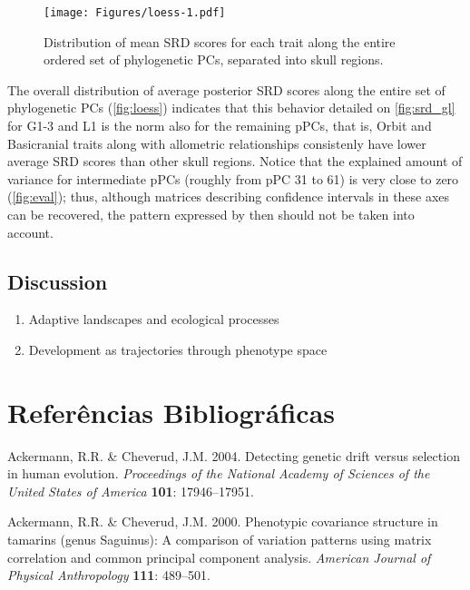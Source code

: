 \documentclass[12pt,twoside]{report}
\begin{document}
\begin{figure}[htbp]
\centering
\texttt{[image: Figures/loess-1.pdf]}
\caption{Distribution of mean SRD scores for each trait along the entire
ordered set of phylogenetic PCs, separated into skull regions.
\label{fig:loess}}
\end{figure}

The overall distribution of average posterior SRD scores along the
entire set of phylogenetic PCs (\autoref{fig:loess}) indicates that this
behavior detailed on \autoref{fig:srd_gl} for G1-3 and L1 is the norm
also for the remaining pPCs, that is, Orbit and Basicranial traits along
with allometric relationships consistenly have lower average SRD scores
than other skull regions. Notice that the explained amount of variance
for intermediate pPCs (roughly from pPC 31 to 61) is very close to zero
(\autoref{fig:eval}); thus, although matrices describing confidence
intervals in these axes can be recovered, the pattern expressed by then
should not be taken into account.

\section{Discussion}\label{discussion-2}

\begin{enumerate}
\def\labelenumi{\arabic{enumi}.}
\item
  Adaptive landscapes and ecological processes
\item
  Development as trajectories through phenotype space
\end{enumerate}

\def\sectionautorefname{Seção} \def\chapterautorefname{Capítulo}
\def\figureautorefname{Figura} \def\tableautorefname{Tabela}


\pagestyle{plain}

\chapter*{Referências Bibliográficas}


Ackermann, R.R. \& Cheverud, J.M. 2004. Detecting genetic drift versus
selection in human evolution. \emph{Proceedings of the National Academy
of Sciences of the United States of America} \textbf{101}: 17946--17951.

Ackermann, R.R. \& Cheverud, J.M. 2000. Phenotypic covariance structure
in tamarins (genus Saguinus): A comparison of variation patterns using
matrix correlation and common principal component analysis.
\emph{American Journal of Physical Anthropology} \textbf{111}: 489--501.
\end{document}
